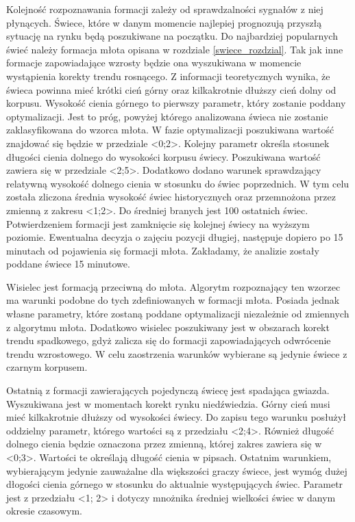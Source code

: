 \documentclass[pdflatex,11pt]{aghdpl}
\begin{document}
Kolejność rozpoznawania formacji zależy od sprawdzalności sygnałów z niej płynących. Świece, które w danym momencie najlepiej prognozują przyszłą sytuację na rynku będą poszukiwane na początku. Do najbardziej popularnych świeć należy formacja młota opisana w rozdziale \ref{swiece_rozdzial}. Tak jak inne formacje zapowiadające wzrosty będzie ona wyszukiwana w momencie wystąpienia korekty trendu rosnącego. Z informacji teoretycznych wynika, że świeca powinna mieć krótki cień górny oraz kilkakrotnie dłuższy cień dolny od korpusu. Wysokość cienia górnego to pierwszy parametr, który zostanie poddany optymalizacji. Jest to próg, powyżej którego analizowana świeca nie zostanie zaklasyfikowana do wzorca młota. W fazie optymalizacji poszukiwana wartość znajdować się będzie w przedziale <0;2>. Kolejny parametr określa stosunek długości cienia dolnego do wysokości korpusu świecy. Poszukiwana wartość zawiera się w przedziale <2;5>. Dodatkowo dodano warunek sprawdzający relatywną wysokość dolnego cienia w stosunku do świec poprzednich. W tym celu została zliczona średnia wysokość świec historycznych oraz przemnożona przez zmienną z zakresu <1;2>. Do średniej branych jest 100 ostatnich świec. Potwierdzeniem formacji jest zamknięcie się kolejnej świecy na wyższym poziomie. Ewentualna decyzja o zajęciu pozycji długiej, następuje dopiero po 15 minutach od pojawienia się formacji młota. Zakładamy, że analizie zostały poddane świece 15 minutowe. 

Wisielec jest formacją przeciwną do młota. Algorytm rozpoznający ten wzorzec ma warunki podobne do tych zdefiniowanych w formacji młota. Posiada jednak własne parametry, które zostaną poddane optymalizacji niezależnie od zmiennych z algorytmu młota. Dodatkowo wisielec poszukiwany jest w obszarach korekt trendu spadkowego, gdyż zalicza się do formacji zapowiadających odwrócenie trendu wzrostowego. W celu zaostrzenia warunków wybierane są jedynie świece z czarnym korpusem.

Ostatnią z formacji zawierających pojedynczą świecę jest spadająca gwiazda. Wyszukiwana jest w momentach korekt rynku niedźwiedzia. Górny cień musi mieć kilkakrotnie dłuższy od wysokości świecy. Do zapisu tego warunku posłużył oddzielny parametr, którego wartości są z przedziału <2;4>. Również długość dolnego cienia będzie oznaczona przez zmienną, której zakres zawiera się w <0;3>. Wartości te określają długość cienia w pipsach. Ostatnim warunkiem, wybierającym jedynie zauważalne dla większości graczy świece, jest wymóg dużej dłogości cienia górnego w stosunku do aktualnie występujących świec. Parametr jest z przedziału <1; 2> i dotyczy mnożnika średniej wielkości świec w danym okresie czasowym.  
\end{document}
